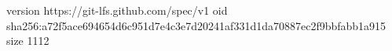 version https://git-lfs.github.com/spec/v1
oid sha256:a72f5ace694654d6c951d7e4c3e7d20241af331d1da70887ec2f9bbfabb1a915
size 1112
